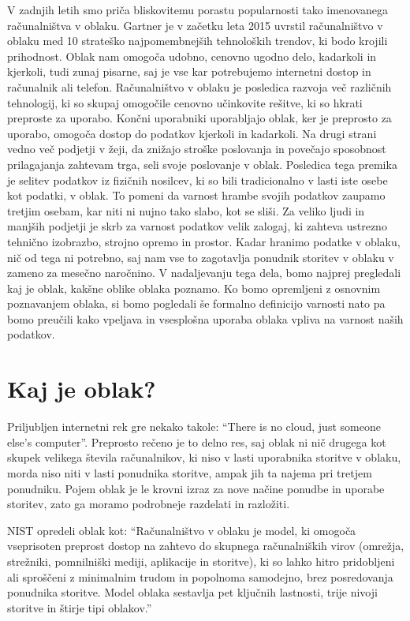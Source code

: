 \documentclass[12pt,a4paper,openany]{book}
\begin{document}
V zadnjih letih smo priča bliskovitemu porastu popularnosti tako imenovanega računalništva v oblaku. Gartner je v začetku leta 2015 uvrstil računalništvo v oblaku med 10 strateško najpomembnejših tehnoloških trendov, ki bodo krojili prihodnost. Oblak nam omogoča udobno, cenovno ugodno delo, kadarkoli in kjerkoli, tudi zunaj pisarne, saj je vse kar potrebujemo internetni dostop in računalnik ali telefon. Računalništvo v oblaku je posledica razvoja več različnih tehnologij, ki so skupaj omogočile cenovno učinkovite rešitve, ki so hkrati preproste za uporabo. Končni uporabniki uporabljajo oblak, ker je preprosto za uporabo, omogoča dostop do podatkov kjerkoli in kadarkoli. Na drugi strani vedno več podjetji v žeji, da znižajo stroške poslovanja in povečajo sposobnost prilagajanja zahtevam trga, seli svoje poslovanje v oblak. Posledica tega premika je selitev podatkov iz fizičnih nosilcev, ki so bili tradicionalno v lasti iste osebe kot podatki, v oblak. To pomeni da varnost hrambe svojih podatkov zaupamo tretjim osebam, kar niti ni nujno tako slabo, kot se sliši. Za veliko ljudi in manjših podjetji je skrb za varnost podatkov velik zalogaj, ki zahteva ustrezno tehnično izobrazbo, strojno opremo in prostor. Kadar hranimo podatke v oblaku, nič od tega ni potrebno, saj nam vse to zagotavlja ponudnik storitev v oblaku v zameno za mesečno naročnino. V nadaljevanju tega dela, bomo najprej pregledali kaj je oblak, kakšne oblike oblaka poznamo. Ko bomo opremljeni z osnovnim poznavanjem oblaka, si bomo pogledali še formalno definicijo varnosti nato pa bomo preučili kako vpeljava in vsesplošna uporaba oblaka vpliva na varnost naših podatkov.


\section{Kaj je oblak?}
\label{sec:Kaj je oblak?}


Priljubljen internetni rek gre nekako takole: “There is no cloud, just someone else's computer”. Preprosto rečeno je to delno res, saj oblak ni nič drugega kot skupek velikega števila računalnikov, ki niso v lasti uporabnika storitve v oblaku, morda niso niti v lasti ponudnika storitve, ampak jih ta najema pri tretjem ponudniku. Pojem oblak je le krovni izraz za nove načine ponudbe in uporabe storitev, zato ga moramo podrobneje razdelati in razložiti.

NIST opredeli oblak kot: “Računalništvo v oblaku je model, ki omogoča vseprisoten preprost dostop na zahtevo do skupnega računalniških virov (omrežja, strežniki, pomnilniški mediji, aplikacije in storitve), ki so lahko hitro pridobljeni ali sproščeni z minimalnim trudom in popolnoma samodejno, brez posredovanja ponudnika storitve. Model oblaka sestavlja pet ključnih lastnosti, trije nivoji storitve in štirje tipi oblakov.”
\end{document}
